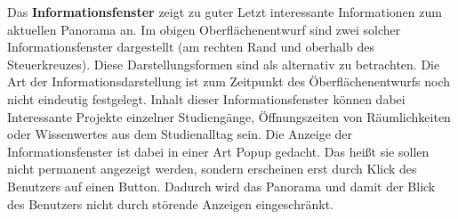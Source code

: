 Das \textbf{Informationsfenster} zeigt zu guter Letzt interessante Informationen zum aktuellen Panorama an. Im obigen Oberflächenentwurf sind zwei solcher Informationsfenster dargestellt (am rechten Rand und oberhalb des Steuerkreuzes). Diese Darstellungsformen sind als alternativ zu betrachten. Die Art der Informationsdarstellung ist zum Zeitpunkt des Öberflächenentwurfs noch nicht eindeutig festgelegt. Inhalt dieser Informationsfenster können dabei Interessante Projekte einzelner Studiengänge, Öffnungszeiten von Räumlichkeiten oder Wissenwertes aus dem Studienalltag sein. Die Anzeige der Informationsfenster ist dabei in einer Art Popup gedacht. Das heißt sie sollen nicht permanent angezeigt werden, sondern erscheinen erst durch Klick des Benutzers auf einen Button. Dadurch wird das Panorama und damit der Blick des Benutzers nicht durch störende Anzeigen eingeschränkt.

\clearpage